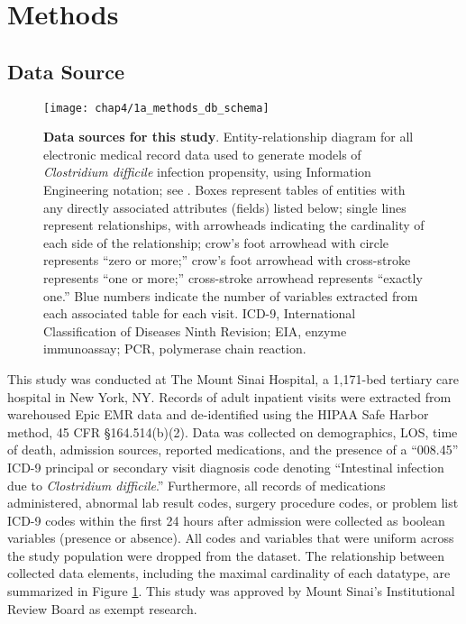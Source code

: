 \section{Methods}

\subsection{Data Source}

\begin{figure}[htb]
  \texttt{[image: chap4/1a\_methods\_db\_schema]}               
  \caption[Data sources for this study]{\textbf{Data sources for this study}. Entity-relationship diagram for all electronic medical record data used to generate models of \emph{Clostridium difficile} infection propensity, using Information Engineering notation; see \textcite{Halpin2010}. Boxes represent tables of entities with any directly associated attributes (fields) listed below; single lines represent relationships, with arrowheads indicating the cardinality of each side of the relationship; crow’s foot arrowhead with circle represents “zero or more;” crow’s foot arrowhead with cross-stroke represents “one or more;” cross-stroke arrowhead represents “exactly one.” Blue numbers indicate the number of variables extracted from each associated table for each visit. ICD-9, International Classification of Diseases Ninth Revision; EIA, enzyme immunoassay; PCR, polymerase chain reaction.}
  \label{fig:db_schema}
\end{figure}

This study was conducted at The Mount Sinai Hospital, a 1,171-bed tertiary care hospital in New York, NY. Records of adult inpatient visits were extracted from warehoused Epic EMR data and de-identified using the HIPAA Safe Harbor method, 45 CFR §164.514(b)(2). Data was collected on demographics, LOS, time of death, admission sources, reported medications, and the presence of a “008.45” ICD-9 principal or secondary visit diagnosis code denoting “Intestinal infection due to \emph{Clostridium difficile}.” Furthermore, all records of medications administered, abnormal lab result codes, surgery procedure codes, or problem list ICD-9 codes within the first 24 hours after admission were collected as boolean variables (presence or absence). All codes and variables that were uniform across the study population were dropped from the dataset. The relationship between collected data elements, including the maximal cardinality of each datatype, are summarized in Figure \ref{fig:db_schema}. This study was approved by Mount Sinai’s Institutional Review Board as exempt research.

